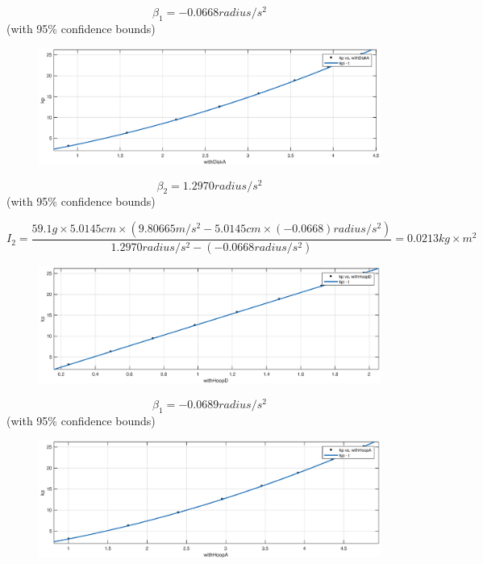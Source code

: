 $$ \beta_1 = -0.0668 radius/s^2$$ (with 95\% confidence bounds) 

\begin{figure}[H]
\centering
\includegraphics[width=\EFWwr]{matlab/wda}
\end{figure}

$$ \beta_2 = 1.2970 radius/s^2$$ (with 95\% confidence bounds) 

$$ I_2 = \frac{59.1 g \times 5.0145 cm \times (9.80665 m/s^2 - 5.0145 cm \times (-0.0668) radius/s^2 )}{1.2970 radius/s^2 -(-0.0668 radius/s^2) } = 0.0213 kg\times m^2 $$











\begin{figure}[H]
\centering
\includegraphics[width=\EFWwr]{matlab/whd}
\end{figure}

$$ \beta_1 = -0.0689 radius/s^2$$ (with 95\% confidence bounds) 

\begin{figure}[H]
\centering
\includegraphics[width=\EFWwr]{matlab/wha}
\end{figure}

